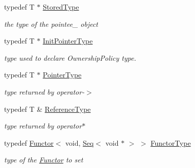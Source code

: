 \begin{DoxyCompactItemize}
\item 
\hypertarget{classLoki_1_1FunctionStorage_a52a1fc18d9685e6496bde1078e6949c5}{}typedef T $\ast$ \hyperlink{classLoki_1_1FunctionStorage_a52a1fc18d9685e6496bde1078e6949c5}{Stored\+Type}\label{classLoki_1_1FunctionStorage_a52a1fc18d9685e6496bde1078e6949c5}

\begin{DoxyCompactList}\small\item\em the type of the pointee\+\_\+ object \end{DoxyCompactList}\item 
\hypertarget{classLoki_1_1FunctionStorage_a08681726c77c6a7492a375de7c34a1be}{}typedef T $\ast$ \hyperlink{classLoki_1_1FunctionStorage_a08681726c77c6a7492a375de7c34a1be}{Init\+Pointer\+Type}\label{classLoki_1_1FunctionStorage_a08681726c77c6a7492a375de7c34a1be}

\begin{DoxyCompactList}\small\item\em type used to declare Ownership\+Policy type. \end{DoxyCompactList}\item 
\hypertarget{classLoki_1_1FunctionStorage_a0e56f22b839615e3082416ca4025ca69}{}typedef T $\ast$ \hyperlink{classLoki_1_1FunctionStorage_a0e56f22b839615e3082416ca4025ca69}{Pointer\+Type}\label{classLoki_1_1FunctionStorage_a0e56f22b839615e3082416ca4025ca69}

\begin{DoxyCompactList}\small\item\em type returned by operator-\/$>$ \end{DoxyCompactList}\item 
\hypertarget{classLoki_1_1FunctionStorage_a9d90fd63b1864a25cda9f1c76a276841}{}typedef T \& \hyperlink{classLoki_1_1FunctionStorage_a9d90fd63b1864a25cda9f1c76a276841}{Reference\+Type}\label{classLoki_1_1FunctionStorage_a9d90fd63b1864a25cda9f1c76a276841}

\begin{DoxyCompactList}\small\item\em type returned by operator$\ast$ \end{DoxyCompactList}\item 
\hypertarget{classLoki_1_1FunctionStorage_ae72e07ed847e973c97f8ab1e035f827a}{}typedef \hyperlink{classLoki_1_1Functor}{Functor}$<$ void, \hyperlink{structLoki_1_1Seq}{Seq}$<$ void $\ast$ $>$ $>$ \hyperlink{classLoki_1_1FunctionStorage_ae72e07ed847e973c97f8ab1e035f827a}{Functor\+Type}\label{classLoki_1_1FunctionStorage_ae72e07ed847e973c97f8ab1e035f827a}

\begin{DoxyCompactList}\small\item\em type of the \hyperlink{classLoki_1_1Functor}{Functor} to set \end{DoxyCompactList}\end{DoxyCompactItemize}

